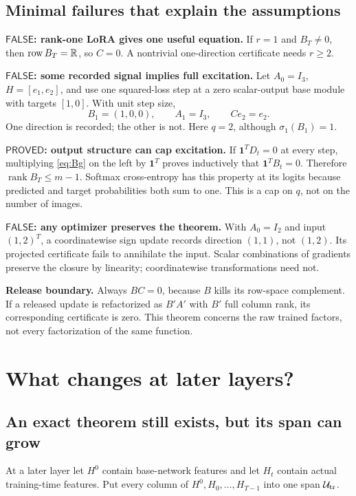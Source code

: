 \documentclass[12pt,a4paper]{article}
\theoremstyle{readable}
\theoremstyle{definition}\newtheorem{example}[theorem]{Example}
\newcommand{\R}{\mathbb R}\newcommand{\rank}{\operatorname{rank}}
\newcommand{\PP}{\mathsf{PROVED}}\newcommand{\FF}{\mathsf{FALSE}}
\begin{document}
\subsection{Minimal failures that explain the assumptions}
\textbf{\(\FF\): rank-one LoRA gives one useful equation.} If \(r=1\) and \(B_T\ne0\), then \(\row B_T=\R\), so \(C=0\). A nontrivial one-direction certificate needs \(r\ge2\).

\textbf{\(\FF\): some recorded signal implies full excitation.} Let \(A_0=I_3\), \(H=[e_1,e_2]\), and use one squared-loss step at a zero scalar-output base module with targets \([1,0]\). With unit step size,
\[
B_1=(1,0,0),\qquad A_1=I_3,\qquad Ce_2=e_2.
\]
One direction is recorded; the other is not. Here \(q=2\), although \(\sigma_1(B_1)=1\).

\textbf{\(\PP\): output structure can cap excitation.} If \(\mathbf1^TD_t=0\) at every step, multiplying \eqref{eq:Bg} on the left by \(\mathbf1^T\) proves inductively that \(\mathbf1^TB_t=0\). Therefore \(\rank B_T\le m-1\). Softmax cross-entropy has this property at its logits because predicted and target probabilities both sum to one. This is a cap on \(q\), not on the number of images.

\textbf{\(\FF\): any optimizer preserves the theorem.} With \(A_0=I_2\) and input \((1,2)^T\), a coordinatewise sign update records direction \((1,1)\), not \((1,2)\). Its projected certificate fails to annihilate the input. Scalar combinations of gradients preserve the closure by linearity; coordinatewise transformations need not.

\textbf{Release boundary.} Always \(BC=0\), because \(B\) kills its row-space complement. If a released update is refactorized as \(B'A'\) with \(B'\) full column rank, its corresponding certificate is zero. This theorem concerns the raw trained factors, not every factorization of the same function.

\section{What changes at later layers?}
\label{sec:drift}

\subsection{An exact theorem still exists, but its span can grow}
At a later layer let \(H^0\) contain base-network features and let \(H_t\) contain actual training-time features. Put every column of \(H^0,H_0,\ldots,H_{T-1}\) into one span \(\mathcal U_{\rm tr}\).
\end{document}
